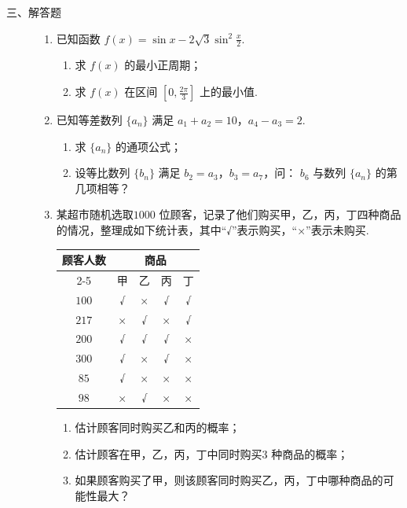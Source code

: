 \begin{description}

    \item[三、解答题]

    \begin{enumerate}[leftmargin=5pt]

      \addtocounter{enumi}{+14}

        \item 已知函数 \( f(x) = \sin x - 2\sqrt{3}\sin^2\frac{x}{2} \).

\begin{enumerate}
\item 求 \( f(x) \) 的最小正周期；
\item 求 \( f(x) \) 在区间 \(\left[0, \frac{2\pi}{3}\right]\) 上的最小值.
\end{enumerate}

        \item 已知等差数列 \(\{a_{n}\}\) 满足 \(a_1 + a_2 = 10\)，\(a_4 - a_3 = 2\).

\begin{enumerate}
\item 求 \(\{a_{n}\}\) 的通项公式；
\item 设等比数列 \(\{b_{n}\}\) 满足 \(b_{2}=a_{3}\)，\(b_{3}=a_{7}\)，问： \(b_{6}\) 与数列 \(\{a_{n}\}\) 的第几项相等？
\end{enumerate}

        \item 某超市随机选取\(1000\text{ 位}\)顾客，记录了他们购买甲，乙，丙，丁四种商品的情况，整理成如下统计表，其中“√”表示购买，“×”表示未购买.

\begin{center}
\renewcommand{\arraystretch}{1.2}
\begin{tabular}{c|cccc}
\hline
顾客人数 & \multicolumn{4}{c}{商品} \\
\cline{2-5}
 & 甲 & 乙 & 丙 & 丁 \\
\hline
\(100\) & √ & × & √ & √ \\
\(217\) & × & √ & × & √ \\
\(200\) & √ & √ & √ & × \\
\(300\) & √ & × & √ & × \\
\(85\) & √ & × & × & × \\
\(98\) & × & √ & × & × \\
\hline
\end{tabular}
\end{center}

\begin{enumerate}
\item 估计顾客同时购买乙和丙的概率；
\item 估计顾客在甲，乙，丙，丁中同时购买\(3\text{ 种}\)商品的概率；
\item 如果顾客购买了甲，则该顾客同时购买乙，丙，丁中哪种商品的可能性最大？
\end{enumerate}


\end{enumerate}
\end{description}
